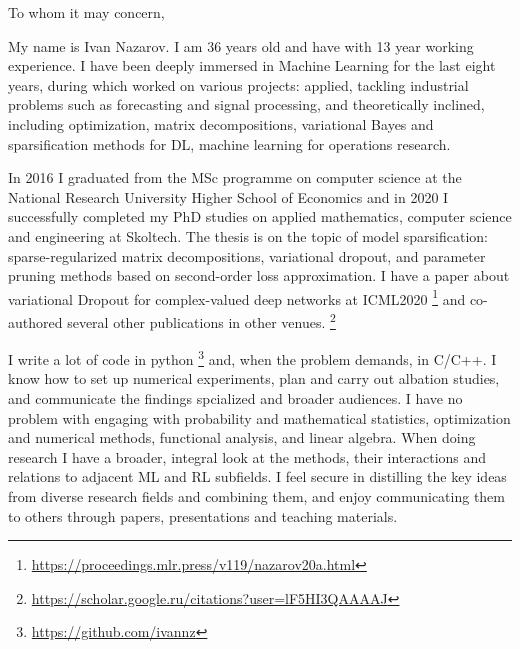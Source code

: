 \documentclass[14pt]{letter}
\begin{document}
\thispagestyle{empty}

%

\vspace{1.5cm}

\begin{minipage}{0.5\linewidth}
To whom it may concern, \par
\end{minipage} \par\bigskip

My name is Ivan Nazarov. I am {36} years old and have with {13} year working experience. I have
been deeply immersed in Machine Learning for the last {eight} years, during which worked on
various projects: applied, tackling industrial problems such as forecasting and signal processing,
and theoretically inclined, including optimization, matrix decompositions, variational Bayes
and sparsification methods for DL, machine learning for operations research. \par\medskip

In 2016 I graduated from the MSc programme on computer science at the National Research
University Higher School of Economics and in 2020 I successfully completed my PhD studies
on applied mathematics, computer science and engineering at Skoltech. The thesis is on
the topic of model sparsification: sparse-regularized matrix decompositions, variational
dropout, and parameter pruning methods based on second-order loss approximation. I have
a paper about variational Dropout for complex-valued deep networks at ICML2020%
\footnote{
    \url{https://proceedings.mlr.press/v119/nazarov20a.html}
} and co-authored several other publications in other venues.%
\footnote{
    \url{https://scholar.google.ru/citations?user=lF5HI3QAAAAJ}
}
\par\medskip

I write a lot of code in python%
\footnote{
    \url{https://github.com/ivannz}
}
and, when the problem demands, in C/C++. I know how to set up numerical experiments, plan
and carry out albation studies, and communicate the findings spcialized and broader audiences.
I have no problem with engaging with probability and mathematical statistics, optimization and
numerical methods, functional analysis, and linear algebra. When doing research I have a broader,
integral look at the methods, their interactions and relations to adjacent ML and RL subfields.
I feel secure in distilling the key ideas from diverse research fields and combining them,
and enjoy communicating them to others through papers, presentations and teaching materials.
\par\medskip
\end{document}
